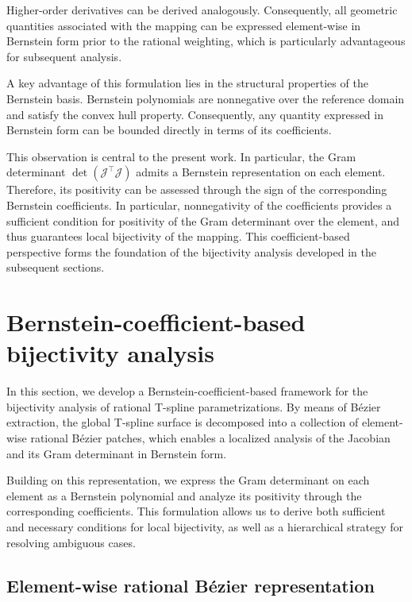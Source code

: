 \documentclass{jssc}
\begin{document}
Higher-order derivatives can be derived analogously. Consequently, all geometric quantities associated with the mapping can be expressed element-wise in Bernstein form prior to the rational weighting, which is particularly advantageous for subsequent analysis.

A key advantage of this formulation lies in the structural properties of the Bernstein basis. Bernstein polynomials are nonnegative over the reference domain and satisfy the convex hull property. Consequently, any quantity expressed in Bernstein form can be bounded directly in terms of its coefficients.

This observation is central to the present work. In particular, the Gram determinant $\det(\bm{\mathcal{J}}^\top \bm{\mathcal{J}})$ admits a Bernstein representation on each element. Therefore, its positivity can be assessed through the sign of the corresponding Bernstein coefficients. In particular, nonnegativity of the coefficients provides a sufficient condition for positivity of the Gram determinant over the element, and thus guarantees local bijectivity of the mapping. This coefficient-based perspective forms the foundation of the bijectivity analysis developed in the subsequent sections.

\section{Bernstein-coefficient-based bijectivity analysis}
\label{sec:theory}

In this section, we develop a Bernstein-coefficient-based framework for the bijectivity analysis of rational T-spline parametrizations. By means of B\'ezier extraction, the global T-spline surface is decomposed into a collection of element-wise rational B\'ezier patches, which enables a localized analysis of the Jacobian and its Gram determinant in Bernstein form.

Building on this representation, we express the Gram determinant on each element as a Bernstein polynomial and analyze its positivity through the corresponding coefficients. This formulation allows us to derive both sufficient and necessary conditions for local bijectivity, as well as a hierarchical strategy for resolving ambiguous cases.

\subsection{Element-wise rational B\'ezier representation}
\end{document}
